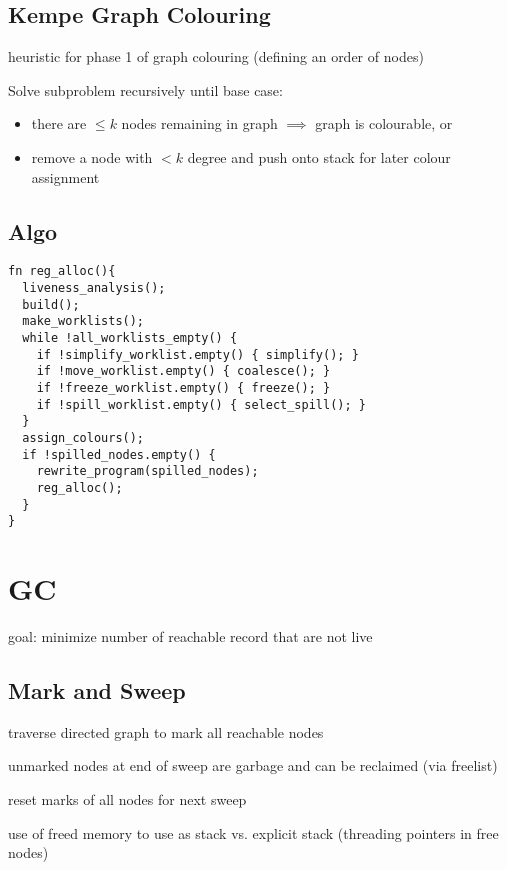 \documentclass[8pt]{extarticle}
\begin{document}
\begin{multicols*}{2}
  \subsection{Kempe Graph Colouring}

  heuristic for phase 1 of graph colouring (defining an order of nodes)
  
  Solve subproblem recursively until base case:
  \begin{itemize}
  \item there are $\leq k$ nodes remaining in graph $\implies$ graph is colourable, or
  \item remove a node with $< k$ degree and push onto stack for later colour assignment
  \end{itemize}
  
  \subsection{Algo}
\begin{verbatim}
fn reg_alloc(){
  liveness_analysis();
  build();
  make_worklists();
  while !all_worklists_empty() {
    if !simplify_worklist.empty() { simplify(); }
    if !move_worklist.empty() { coalesce(); }
    if !freeze_worklist.empty() { freeze(); }
    if !spill_worklist.empty() { select_spill(); }
  }
  assign_colours();
  if !spilled_nodes.empty() {
    rewrite_program(spilled_nodes);
    reg_alloc();
  }
}
\end{verbatim}
  
  \vfill\null
  \columnbreak

  \section{GC}

  goal: minimize number of reachable record that are not live

  \subsection{Mark and Sweep}

  traverse directed graph to mark all reachable nodes

  unmarked nodes at end of sweep are garbage and can be reclaimed (via freelist)

  reset marks of all nodes for next sweep

  use of freed memory to use as stack vs. explicit stack (threading pointers in free nodes)


\end{multicols*}
\end{document}
